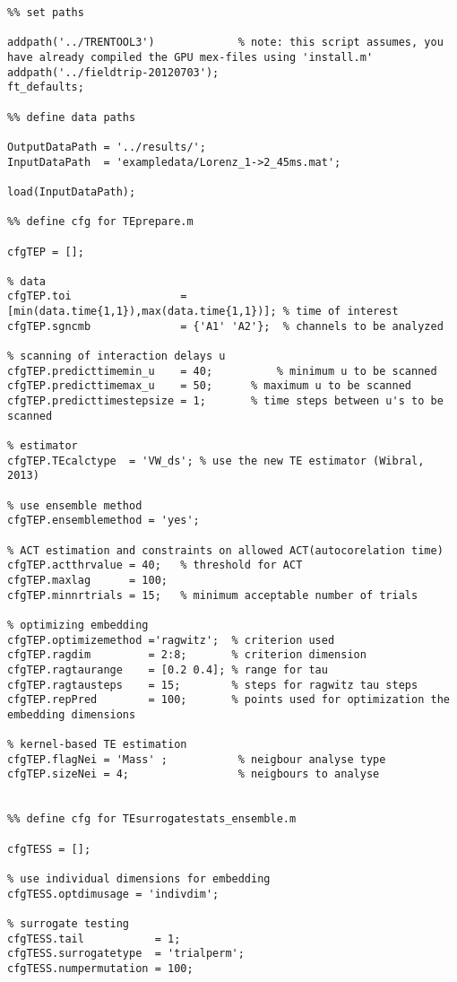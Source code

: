 \begin{lstlisting}
%% set paths

addpath('../TRENTOOL3')             % note: this script assumes, you have already compiled the GPU mex-files using 'install.m'
addpath('../fieldtrip-20120703');
ft_defaults;

%% define data paths

OutputDataPath = '../results/';
InputDataPath  = 'exampledata/Lorenz_1->2_45ms.mat';

load(InputDataPath);

%% define cfg for TEprepare.m

cfgTEP = [];

% data
cfgTEP.toi                 = [min(data.time{1,1}),max(data.time{1,1})]; % time of interest
cfgTEP.sgncmb              = {'A1' 'A2'};  % channels to be analyzed

% scanning of interaction delays u
cfgTEP.predicttimemin_u    = 40;		  % minimum u to be scanned
cfgTEP.predicttimemax_u    = 50;	  % maximum u to be scanned
cfgTEP.predicttimestepsize = 1; 	  % time steps between u's to be scanned

% estimator
cfgTEP.TEcalctype  = 'VW_ds'; % use the new TE estimator (Wibral, 2013)

% use ensemble method
cfgTEP.ensemblemethod = 'yes';

% ACT estimation and constraints on allowed ACT(autocorelation time)
cfgTEP.actthrvalue = 40;   % threshold for ACT
cfgTEP.maxlag      = 100;
cfgTEP.minnrtrials = 15;   % minimum acceptable number of trials

% optimizing embedding
cfgTEP.optimizemethod ='ragwitz';  % criterion used
cfgTEP.ragdim         = 2:8;       % criterion dimension
cfgTEP.ragtaurange    = [0.2 0.4]; % range for tau
cfgTEP.ragtausteps    = 15;        % steps for ragwitz tau steps
cfgTEP.repPred        = 100;       % points used for optimization the embedding dimensions

% kernel-based TE estimation
cfgTEP.flagNei = 'Mass' ;           % neigbour analyse type
cfgTEP.sizeNei = 4;                 % neigbours to analyse


%% define cfg for TEsurrogatestats_ensemble.m

cfgTESS = [];

% use individual dimensions for embedding
cfgTESS.optdimusage = 'indivdim';

% surrogate testing
cfgTESS.tail           = 1;
cfgTESS.surrogatetype  = 'trialperm';
cfgTESS.numpermutation = 100;


\end{lstlisting}
